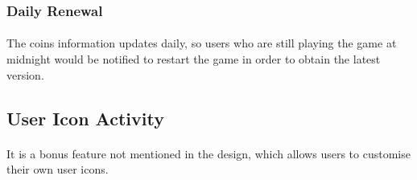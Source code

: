 \documentclass[12pt]{article}
\begin{document}
\subsubsection{Daily Renewal}
\paragraph{}
The coins information updates daily, so users who are still playing the game at midnight would be notified to restart the game in order to obtain the latest version.

\subsection{\color{red}User Icon Activity}
\paragraph{}
It is a bonus feature not mentioned in the design, which allows users to customise their own user icons.
\end{document}
